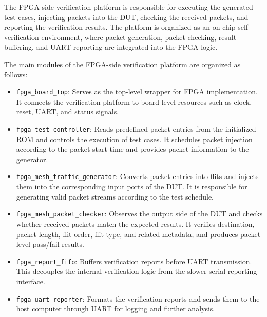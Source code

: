 The FPGA-side verification platform is responsible for executing the generated test cases, injecting packets into the DUT, checking the received packets, and reporting the verification results. The platform is organized as an on-chip self-verification environment, where packet generation, packet checking, result buffering, and UART reporting are integrated into the FPGA logic.

The main modules of the FPGA-side verification platform are organized as follows:

\begin{itemize}
    \item \texttt{fpga\_board\_top}: Serves as the top-level wrapper for FPGA implementation. It connects the verification platform to board-level resources such as clock, reset, UART, and status signals.

    \item \texttt{fpga\_test\_controller}: Reads predefined packet entries from the initialized ROM and controls the execution of test cases. It schedules packet injection according to the packet start time and provides packet information to the generator.

    \item \texttt{fpga\_mesh\_traffic\_generator}: Converts packet entries into flits and injects them into the corresponding input ports of the DUT. It is responsible for generating valid packet streams according to the test schedule.

    \item \texttt{fpga\_mesh\_packet\_checker}: Observes the output side of the DUT and checks whether received packets match the expected results. It verifies destination, packet length, flit order, flit type, and related metadata, and produces packet-level pass/fail results.

    \item \texttt{fpga\_report\_fifo}: Buffers verification reports before UART transmission. This decouples the internal verification logic from the slower serial reporting interface.

    \item \texttt{fpga\_uart\_reporter}: Formats the verification reports and sends them to the host computer through UART for logging and further analysis.
\end{itemize}
